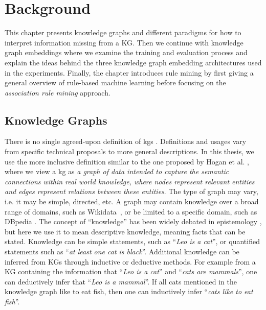 \chapter{Background}

This chapter presents knowledge graphs and different paradigms for how to interpret information missing from a KG. Then we continue with knowledge graph embeddings where we examine the training and evaluation process and explain the ideas behind the three knowledge graph embedding architectures used in the experiments. Finally, the chapter introduces rule mining by first giving a general overview of rule-based machine learning before focusing on the \textit{association rule mining} approach.

\section{Knowledge Graphs}
There is no single agreed-upon definition of \glspl{kg} \cite{bergman_2019, bonatti2019knowledge, ehrlinger2016towards}. Definitions and usages vary from specific technical proposals to more general descriptions. In this thesis, we use the more inclusive definition similar to the one proposed by Hogan et al. \cite{hogan2020knowledge}, where we view a \gls{kg} as \textit{a graph of data intended to capture the semantic connections within real world knowledge, where nodes represent relevant entities and edges represent relations between these entities}. The type of graph may vary, i.e. it may be simple, directed, etc. A graph may contain knowledge over a broad range of domains, such as Wikidata~\cite{lehmann2015dbpedia}, or be limited to a specific domain, such as DBpedia \cite{fellbaum2010wordnet}. The concept of ``knowledge'' has been widely debated in epistemology \cite{chappell2005plato, kirkham1984does, wittgenstein1969certainty, gottschalk2008internet}, but here we use it to mean descriptive knowledge, meaning facts that can be stated. Knowledge can be simple statements, such as ``\textit{Leo is a cat}'', or quantified statements such as ``\textit{at least one cat is black}''. %
Additional knowledge can be inferred from KGs through inductive or deductive methods. For example from a KG containing the information that ``\textit{Leo is a cat}'' and ``\textit{cats are mammals}'', one can deductively infer that ``\textit{Leo is a mammal}''. If all cats mentioned in the knowledge graph like to eat fish, then one can inductively infer ``\textit{cats like to eat fish}''.

